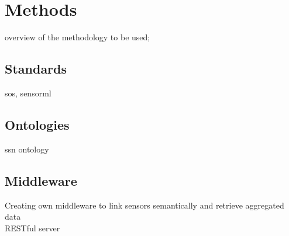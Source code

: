 \chapter{Methods}
\label{chap:methods}

overview of the methodology to be used;

\section{Standards}
\ac{sos}, \ac{sensorml}


\section{Ontologies}
\ac{ssn} ontology


\section{Middleware}
Creating own middleware to link sensors semantically and retrieve aggregated data\\

RESTful server




